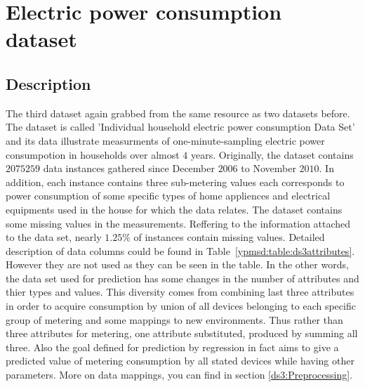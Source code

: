 \section{Electric power consumption dataset}
\subsection{Description}
The third dataset again grabbed from the same resource as two datasets before.
The dataset is called 'Individual household electric power consumption Data
Set\cite{ds:household}' and its data illustrate measurments of
one-minute-sampling electric power consumpotion in households over almost $4$
years. Originally, the dataset contains $2075259$ data instances gathered since
December $2006$ to November $2010$. In addition, each instance contains three
sub-metering values each corresponds to power consumption of some specific types
of home appliences and electrical equipments used in the house for which the
data relates. The dataset contains some missing values in the measurements.
Reffering to the information attached to the data set, nearly $1.25\%$ of
instances contain missing values. Detailed description of data columns could be
found in Table~\ref{ypmsd:table:ds3attributes}.\\
However they are not used as they can be seen in the table. In the other words,
the data set used for prediction has some changes in the number of attributes
and thier types and values.
This diversity comes from combining last three attributes in order to acquire consumption by union of all devices
belonging to each specific group of metering and some mappings to new
environments.
Thus rather than three attributes for metering, one attribute substituted, produced by summing all three. Also the
goal defined for prediction by regression in fact aims to give a predicted value
of metering consumption by all stated devices while having other parameters.
More on data mappings, you can find in section \ref{ds3:Preprocessing}.


